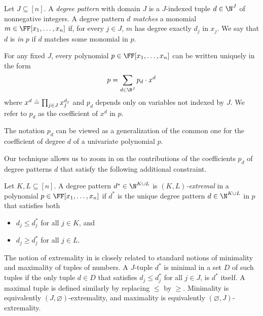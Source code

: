 \begin{definition}\label{def.degree-pattern}
  Let \(J \subseteq [n]\).
  A \emph{degree pattern} with domain \(J\) is a \(J\)-indexed
  tuple \(d \in \N^J\) of nonnegative integers.
  A degree pattern \(d\) \emph{matches} a monomial
  $m \in \FF[x_1,\dots,x_n]$
  if,
  for every \(j \in J\),
  \(m\) has degree exactly $d_j$ in $x_j$.
  We say that \(d\) is \emph{in} \(p\) if \(d\) matches some monomial in \(p\).

  For any fixed \(J\),
  every polynomial \(p \in \FF[x_1,\ldots,x_n]\) can be written uniquely in
  the form
  \begin{equation*}
    p = \sum_{d \in \N^J}  p_d \cdot x^d
  \end{equation*}
  where \(x^{\smash{d}} \doteq \prod_{j\in J} x_j^{\smash{d_j}}\)
  and \(p_d\) depends only on variables not indexed by \(J\).
  We refer to \(p_d\) as the coefficient of \(x^d\) in \(p\).
\end{definition}

The notation $p_d$ can be viewed as a generalization of the common one for the
coefficient of degree $d$ of a univariate polynomial $p$.

Our technique allows us to zoom in on the contributions of the coefficients
$p_d$ of degree patterns $d$ that satisfy the
following additional constraint.
\begin{definition}\label{def.extremal}
  Let \(K, L \subseteq [n]\).
  A degree pattern $d^* \in \N^{K \cup L}$ is \emph{$(K,L)$-extremal} in
  a polynomial $p \in \FF[x_1,\dots,x_n]$
  if $d^*$ is the unique degree pattern $d \in \N^{K \cup L}$ in $p$ that satisfies both
  \begin{itemize}
    \item[(i)] $d_j \le d^*_j$ for all $j \in K$, and
    \item[(ii)] $d_j \ge d^*_j$ for all $j \in L$.
  \end{itemize}
\end{definition}
The notion of extremality in  is closely related to
standard notions of minimality and maximality of tuples of numbers.
A \(J\)-tuple $d^*$  is minimal in a set $D$ of such tuples
if the only tuple $d \in D$
that satisfies $d_j \le d^*_j$ for all $j \in J$,
is $d^*$ itself.
A maximal tuple is defined similarly by replacing $\le$ by $\ge$.
Minimality is equivalently \((J,\varnothing)\)-extremality,
and maximality is equivalently \((\varnothing,J)\)-extremality.

